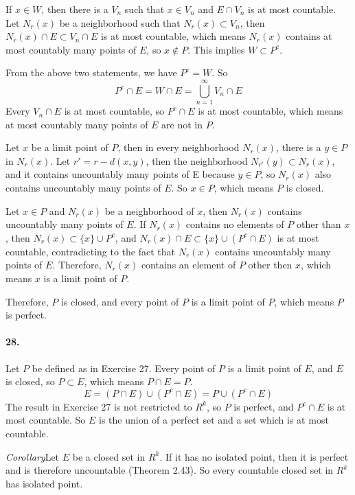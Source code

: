 \documentclass[a4paper]{article}
\begin{document}
If $x\in W$, then there is a $V_n$ such that $x\in V_n$ and $E\cap V_n$ is at most countable. Let $N_r(x)$ be a neighborhood such that $N_r(x)\subset V_n$, then $N_r(x)\cap E\subset V_n\cap E$ is at most countable, which means $N_r(x)$ contains at most countably many points of $E$, so $x\not\in P$. This implies $W\subset P^c$.

From the above two statements, we have $P^c=W$. So
\[
P^c\cap E=W\cap E=\bigcup_{n=1}^\infty V_n\cap E
\]
Every $V_n\cap E$ is at most countable, so $P^c\cap E$ is at most countable, which means at most countably many points of $E$ are not in $P$.
\medskip

Let $x$ be a limit point of $P$, then in every neighborhood $N_r(x)$, there is a $y\in P$ in $N_r(x)$. Let $r'=r-d(x,y)$, then the neighborhood $N_{r'}(y)\subset N_r(x)$, and it contains uncountably many points of E because $y\in P$, so $N_r(x)$ also contains uncountably many points of $E$. So $x\in P$, which means $P$ is closed.

Let $x\in P$ and $N_r(x)$ be a neighborhood of $x$, then $N_r(x)$ contains uncountably many points of $E$. If $N_r(x)$ contains no elements of $P$ other than $x$, then $N_r(x)\subset\{x\}\cup P^c$, and $N_r(x)\cap E\subset \{x\}\cup(P^c\cap E)$ is at most countable, contradicting to the fact that $N_r(x)$ contains uncountably many points of $E$. Therefore, $N_r(x)$ contains an element of $P$ other then $x$, which means $x$ is a limit point of $P$. 

Therefore, $P$ is closed, and every point of $P$ is a limit point of $P$, which means $P$ is perfect.

\paragraph{28.}
Let $P$ be defined as in Exercise 27. Every point of $P$ is a limit point of $E$, and $E$ is closed, so $P\subset E$, which means $P\cap E=P$.
\[
E=(P\cap E)\cup(P^c\cap E)=P\cup(P^c\cap E)
\]
The result in Exercise 27 is not restricted to $R^k$, so $P$ is perfect, and $P^c\cap E$ is at most countable. So $E$ is the union of a perfect set and a set which is at most countable. \medskip

\textit{Corollary}\quad Let $E$ be a closed set in $R^k$. If it has no isolated point, then it is perfect and is therefore uncountable (Theorem 2.43). So every countable closed set in $R^k$ has isolated point.
\end{document}
